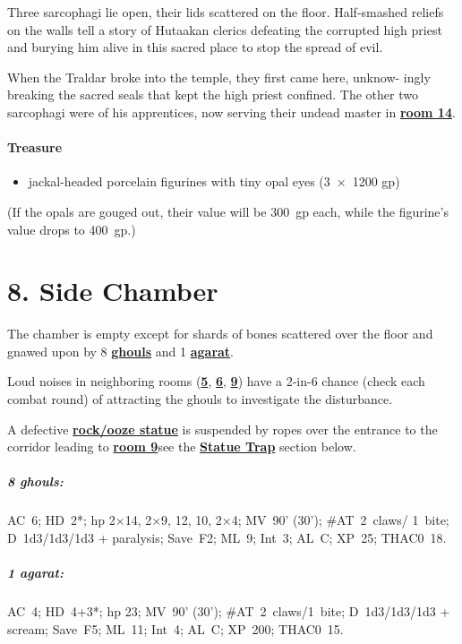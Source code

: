 \documentclass[english,11pt,openany,letterpaper,twocolumn]{book}
\begin{document}
Three sarcophagi lie open, their lids scattered on the floor. Half-smashed reliefs on the walls tell a story of Hutaakan clerics defeating the corrupted high priest and burying him alive in this sacred place to stop the spread of evil.

\tab When the Traldar broke into the temple, they first came here, unknow- ingly breaking the sacred seals that kept the high priest confined. The other two sarcophagi were of his apprentices, now serving their undead master in \hyperlink{room14}{\textbf{room 14}}.

\skipline
\paragraph{Treasure}
\begin{itemize}[leftmargin=*]
	\item jackal-headed porcelain figurines with tiny opal eyes (3~×~1200 gp)
\end{itemize}

(If the opals are gouged out, their value will be 300~gp each, while the figurine's value drops to 400~gp.)


\hypertarget{room8}{}
\section{8. Side Chamber}

The chamber is empty except for shards of bones scattered over the floor and gnawed upon by 8 \hyperlink{ghoul}{\textbf{ghouls}} and 1 \hyperlink{agarat}{\textbf{agarat}}.

\tab Loud noises in neighboring rooms (\hyperlink{room5}{\textbf{5}}, \hyperlink{room6}{\textbf{6}}, \hyperlink{room9}{\textbf{9}}) have a 2-in-6 chance (check each combat round) of attracting the ghouls to investigate the disturbance.

\tab A defective \hyperlink{statue}{\textbf{rock/ooze statue}} is suspended by ropes over the entrance to the corridor leading to \hyperlink{room9}{\textbf{room 9}}\dash see the \hyperlink{statue-trap}{\textbf{Statue Trap}} section below.

\begin{textbox}
	\subparagraph{8 ghouls:} AC~6; HD~2*; hp 2×14, 2×9, 12, 10, 2×4; MV~90' (30'); \#AT~2~claws/ 1~bite; D~1d3/1d3/1d3 + paralysis; Save~F2; ML~9; Int~3; AL~C; XP~25; THAC0~18.
	
	\subparagraph{1 agarat:} AC~4; HD~4+3*; hp 23; MV~90' (30'); \#AT~2~claws/1~bite; D~1d3/1d3/1d3 + scream; Save~F5; ML~11; Int~4; AL~C; XP~200; THAC0~15.
\end{textbox}
\end{document}
